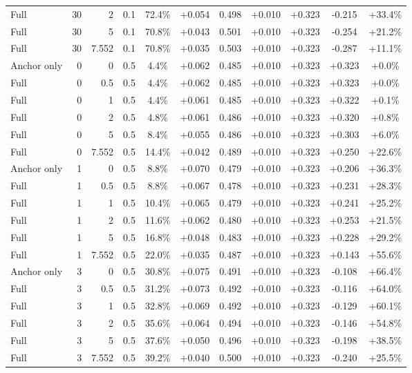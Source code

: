 \begin{table}[htbp]
\begin{tabular}{lrrrccccccc}
Full & 30 & 2 & 0.1 & 72.4\% & +0.054 & 0.498 & +0.010 & +0.323 & -0.215 & +33.4\% \\
Full & 30 & 5 & 0.1 & 70.8\% & +0.043 & 0.501 & +0.010 & +0.323 & -0.254 & +21.2\% \\
Full & 30 & 7.552 & 0.1 & 70.8\% & +0.035 & 0.503 & +0.010 & +0.323 & -0.287 & +11.1\% \\
Anchor only & 0 & 0 & 0.5 & 4.4\% & +0.062 & 0.485 & +0.010 & +0.323 & +0.323 & +0.0\% \\
Full & 0 & 0.5 & 0.5 & 4.4\% & +0.062 & 0.485 & +0.010 & +0.323 & +0.323 & +0.0\% \\
Full & 0 & 1 & 0.5 & 4.4\% & +0.061 & 0.485 & +0.010 & +0.323 & +0.322 & +0.1\% \\
Full & 0 & 2 & 0.5 & 4.8\% & +0.061 & 0.486 & +0.010 & +0.323 & +0.320 & +0.8\% \\
Full & 0 & 5 & 0.5 & 8.4\% & +0.055 & 0.486 & +0.010 & +0.323 & +0.303 & +6.0\% \\
Full & 0 & 7.552 & 0.5 & 14.4\% & +0.042 & 0.489 & +0.010 & +0.323 & +0.250 & +22.6\% \\
Anchor only & 1 & 0 & 0.5 & 8.8\% & +0.070 & 0.479 & +0.010 & +0.323 & +0.206 & +36.3\% \\
Full & 1 & 0.5 & 0.5 & 8.8\% & +0.067 & 0.478 & +0.010 & +0.323 & +0.231 & +28.3\% \\
Full & 1 & 1 & 0.5 & 10.4\% & +0.065 & 0.479 & +0.010 & +0.323 & +0.241 & +25.2\% \\
Full & 1 & 2 & 0.5 & 11.6\% & +0.062 & 0.480 & +0.010 & +0.323 & +0.253 & +21.5\% \\
Full & 1 & 5 & 0.5 & 16.8\% & +0.048 & 0.483 & +0.010 & +0.323 & +0.228 & +29.2\% \\
Full & 1 & 7.552 & 0.5 & 22.0\% & +0.035 & 0.487 & +0.010 & +0.323 & +0.143 & +55.6\% \\
Anchor only & 3 & 0 & 0.5 & 30.8\% & +0.075 & 0.491 & +0.010 & +0.323 & -0.108 & +66.4\% \\
Full & 3 & 0.5 & 0.5 & 31.2\% & +0.073 & 0.492 & +0.010 & +0.323 & -0.116 & +64.0\% \\
Full & 3 & 1 & 0.5 & 32.8\% & +0.069 & 0.492 & +0.010 & +0.323 & -0.129 & +60.1\% \\
Full & 3 & 2 & 0.5 & 35.6\% & +0.064 & 0.494 & +0.010 & +0.323 & -0.146 & +54.8\% \\
Full & 3 & 5 & 0.5 & 37.6\% & +0.050 & 0.496 & +0.010 & +0.323 & -0.198 & +38.5\% \\
Full & 3 & 7.552 & 0.5 & 39.2\% & +0.040 & 0.500 & +0.010 & +0.323 & -0.240 & +25.5\% \\

\end{tabular}
\end{table}
